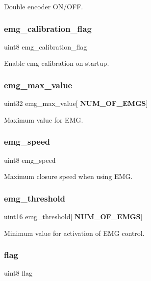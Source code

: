 Double encoder O\+N/\+O\+FF. \mbox{\label{structst__mem_a78f0b0c6db2a7118cd15ec0aa38ccdb9}} 
\subsubsection{emg\+\_\+calibration\+\_\+flag}
{\footnotesize\ttfamily uint8 emg\+\_\+calibration\+\_\+flag}

Enable emg calibration on startup. \mbox{\label{structst__mem_aeb71cf2bff2584abb616d4b5dcc4c4af}} 
\subsubsection{emg\+\_\+max\+\_\+value}
{\footnotesize\ttfamily uint32 emg\+\_\+max\+\_\+value[\textbf{ N\+U\+M\+\_\+\+O\+F\+\_\+\+E\+M\+GS}]}

Maximum value for E\+MG. \mbox{\label{structst__mem_ae8e800591064bf14eb2dd3a3fb2c325b}} 
\subsubsection{emg\+\_\+speed}
{\footnotesize\ttfamily uint8 emg\+\_\+speed}

Maximum closure speed when using E\+MG. \mbox{\label{structst__mem_aaeb84b2fd1a137ee9234fd3c24c97aaa}} 
\subsubsection{emg\+\_\+threshold}
{\footnotesize\ttfamily uint16 emg\+\_\+threshold[\textbf{ N\+U\+M\+\_\+\+O\+F\+\_\+\+E\+M\+GS}]}

Minimum value for activation of E\+MG control. \mbox{\label{structst__mem_af11e40d15a1361229a78e772af5b3c94}} 
\subsubsection{flag}
{\footnotesize\ttfamily uint8 flag}

